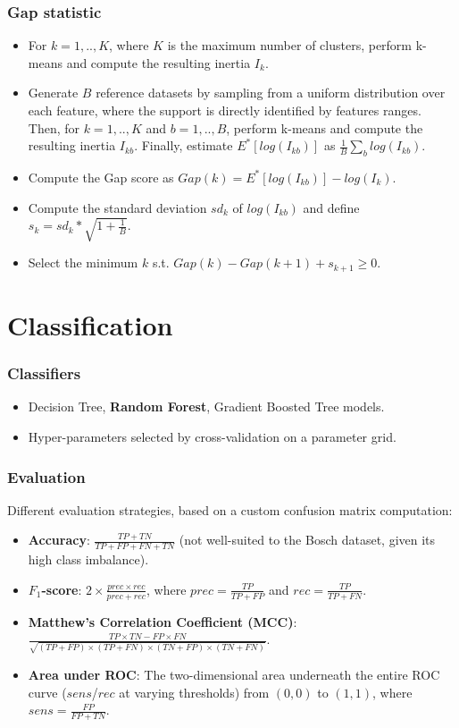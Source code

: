 \documentclass{beamer}
\begin{document}
\begin{frame}
  \frametitle{Gap statistic}
    \begin{itemize}[<+->]
      \item For $k = 1, .., K$, where $K$ is the maximum number of clusters, perform k-means and compute the resulting inertia $I_{k}$.
      \item Generate $B$ reference datasets by sampling from a uniform distribution over each feature, where the support is directly identified by features ranges. Then, for $k = 1, .., K$ and $b = 1, .., B$, perform k-means and compute the resulting inertia $I_{kb}$. Finally, estimate $E^{*}[log(I_{kb})]$ as $\frac{1}{B} \sum_{b}log(I_{kb})$.
      \item Compute the Gap score as $Gap(k) = E^{*}[log(I_{kb})] - log(I_{k})$.
      \item Compute the standard deviation $sd_{k}$ of $log(I_{kb})$ and define $s_{k} = sd_{k} * \sqrt{1 + \frac{1}{B}}$.
      \item Select the minimum $k$ s.t. $Gap(k) - Gap(k + 1) + s_{k + 1} \geq 0$.
    \end{itemize}
\end{frame}

\section{Classification}
\begin{frame}
  \frametitle{Classifiers}
    \begin{itemize}
      \item Decision Tree, \textbf{Random Forest}, Gradient Boosted Tree models.
      \item Hyper-parameters selected by cross-validation on a parameter grid.
    \end{itemize}
\end{frame}

\begin{frame}
  \frametitle{Evaluation}
  Different evaluation strategies, based on a custom confusion matrix computation:
    \begin{itemize}
      \item \textbf{Accuracy}: $\frac{TP + TN}{TP + FP + FN + TN}$ (not well-suited to the Bosch dataset, given its high class imbalance).
      \item \textbf{$F_{1}$-score}: $2\times\frac{prec \times rec}{prec + rec}$, where $prec = \frac{TP}{TP + FP}$ and $rec = \frac{TP}{TP + FN}$.
      \item \textbf{Matthew's Correlation Coefficient (MCC)}: $\frac{TP \times TN - FP \times FN}{\sqrt{(TP + FP) \times (TP + FN) \times (TN + FP) \times (TN + FN)}}$. 
      \item \textbf{Area under ROC}: The two-dimensional area underneath the entire ROC curve ($sens$/$rec$ at varying thresholds) from $(0,0)$ to $(1,1)$, where $sens = \frac{FP}{FP + TN}$.
    \end{itemize}
\end{frame}
\end{document}
